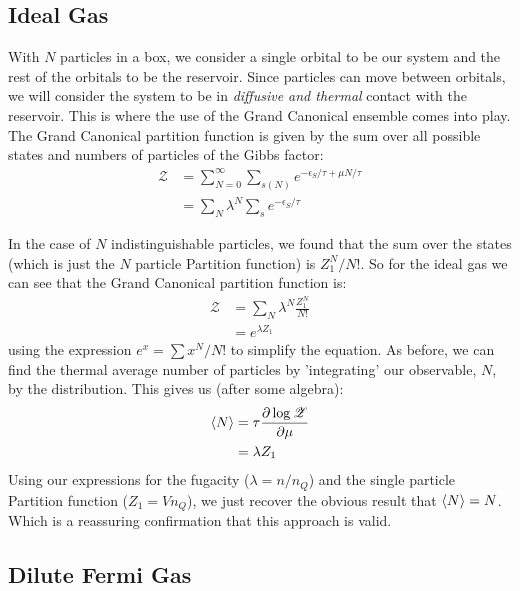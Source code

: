 \subsection{Ideal Gas}
With $N$ particles in a box, we consider a single orbital to be our system and the rest of the orbitals to be the reservoir. Since particles can move between orbitals, we will consider the system to be in \emph{diffusive and thermal} contact with the reservoir. This is where the use of the Grand Canonical ensemble comes into play. The Grand Canonical partition function is given by the sum over all possible states and numbers of particles of the Gibbs factor:
\begin{align}
\mathscr{Z} &= \sum_{N=0}^{\infty} \sum_{s(N)} e^{-\epsilon_{S}/\tau 
	+ \mu N/\tau}\\
            &= \sum_N \lambda^N \sum_s e^{-\epsilon_{S}/\tau}
\end{align}

In the case of $N$ indistinguishable particles, we found that the sum over the states (which is just the $N$ particle Partition function) is $Z_1^N/N!$. So for the ideal gas we can see that the Grand Canonical partition function is:
\begin{align}
\mathscr{Z} &= \sum_N \lambda^N \frac{Z_1^N}{N!} \\
	        &= e^{\lambda Z_1}
\end{align}
using the expression $e^x = \sum x^N/N!$ to simplify the equation. As before, we can find the thermal average number of particles by 'integrating' our observable, $N$, by the distribution. This gives us (after some algebra):
\begin{align}
\Braket{N} &= \tau \frac{\partial \log{\mathscr{Z}}}{\partial \mu}\\
	       &= \lambda Z_1
\end{align}
Using our expressions for the fugacity ($\lambda = n/n_Q$) and the single particle Partition function ($Z_1 = V n_Q$), we just recover the obvious result that $\Braket{N} = N$. Which is a reassuring confirmation that this approach is valid.

\subsection{Dilute Fermi Gas}






